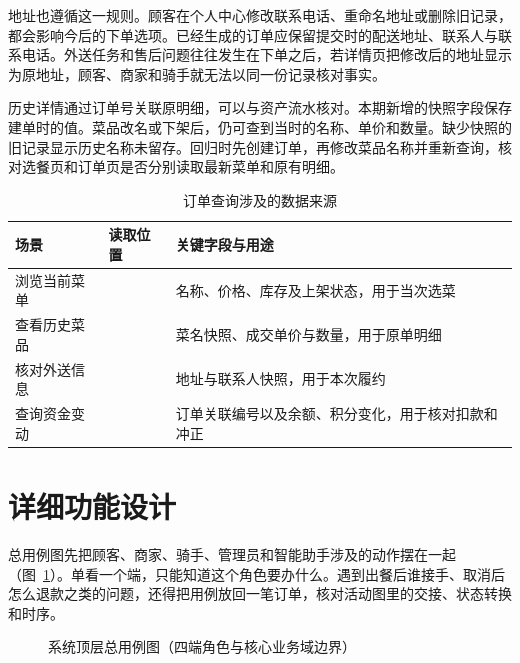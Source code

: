 地址也遵循这一规则。顾客在个人中心修改联系电话、重命名地址或删除旧记录，都会影响今后的下单选项。已经生成的订单应保留提交时的配送地址、联系人与联系电话。外送任务和售后问题往往发生在下单之后，若详情页把修改后的地址显示为原地址，顾客、商家和骑手就无法以同一份记录核对事实。

历史详情通过订单号关联原明细，可以与资产流水核对。本期新增的快照字段保存建单时的值。菜品改名或下架后，仍可查到当时的名称、单价和数量。缺少快照的旧记录显示历史名称未留存。回归时先创建订单，再修改菜品名称并重新查询，核对选餐页和订单页是否分别读取最新菜单和原有明细。

\begin{table}[!htbp]
  \centering
  \caption{订单查询涉及的数据来源}\label{tab:def-order-data-origin}
  \reporttablesize
  \begin{tabularx}{\linewidth}{@{}L{.21\linewidth}YY@{}}
  \toprule
  场景 & 读取位置 & 关键字段与用途 \\
  \midrule
  浏览当前菜单 &  & 名称、价格、库存及上架状态，用于当次选菜 \\
  查看历史菜品 &  & 菜名快照、成交单价与数量，\mbox{用于原单明细} \\
  核对外送信息 &  & 地址与联系人快照，用于本次履约 \\
  查询资金变动 &  & 订单关联编号以及余额、积分变化，用于核对扣款和冲正 \\
  \bottomrule
  \end{tabularx}
\end{table}

\section{详细功能设计}

总用例图先把顾客、商家、骑手、管理员和智能助手涉及的动作摆在一起（图~\mbox{\ref{fig:def-usecase-all}}）。单看一个端，只能知道这个角色要办什么。遇到出餐后谁接手、取消后怎么退款之类的问题，还得把用例放回一笔订单，核对活动图里的交接、状态转换和时序。

\begin{figure}[!htbp]
  \centering
  \caption{系统顶层总用例图（四端角色与核心业务域边界）}\label{fig:def-usecase-all}
\end{figure}

